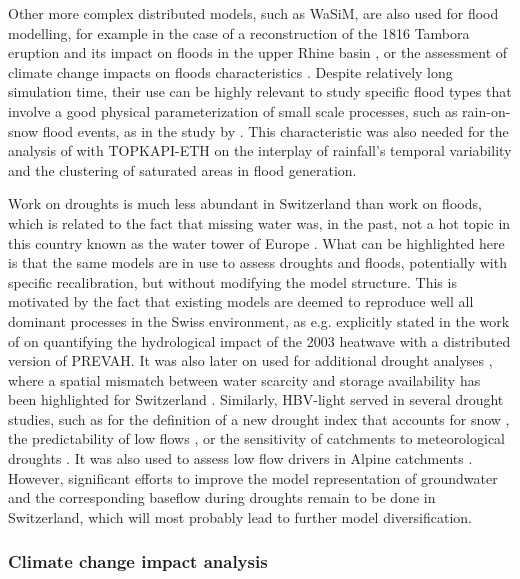 \documentclass[10pt,a4paper]{article}
\begin{document}
Other more complex distributed models, such as WaSiM, are also used for flood modelling, for example in the case of a reconstruction of the 1816 Tambora eruption and its impact on floods in the upper Rhine basin \citep[see Fig. \ref{fig:map};][]{Rossler2018}, or the assessment of climate change impacts on floods characteristics \citep{Keller2019a}. Despite relatively long simulation time, their use can be highly relevant to study specific flood types that involve a good physical parameterization of small scale processes, such as rain-on-snow flood events, as in the study by \citet{Rossler2014}. This characteristic was also needed for the analysis of \citet{Paschalis_2014} with TOPKAPI-ETH on the interplay of rainfall's temporal variability and the clustering of saturated areas in flood generation.

Work on droughts is much less abundant in Switzerland than work on floods, which is related to the fact that missing water was, in the past, not a hot topic in this country known as the water tower of Europe \citep{Milano2015}. What can be highlighted here is that the same models are in use to assess droughts and floods, potentially with specific recalibration, but without modifying the model structure. This is motivated by the fact that existing models are deemed to reproduce well all dominant processes in the Swiss environment, as e.g. explicitly stated in the work of \citet{Zappa2007a} on quantifying the hydrological impact of the 2003 heatwave with a distributed version of PREVAH. It was also later on used for additional drought analyses \citep{Brunner2019e, Zappa2019}, where a spatial mismatch between water scarcity and storage availability has been highlighted for Switzerland \citep{Brunner2019e}. Similarly, HBV-light served in several drought studies, such as for the definition of a new drought index that accounts for snow \citep{Staudinger2014}, the predictability of low flows \citep{Staudinger2014a}, or the sensitivity of catchments to meteorological droughts \citep{Staudinger2015}. It was also used to assess low flow drivers in Alpine catchments \citep{Arnoux_2020}. However, significant efforts to improve the model representation of groundwater and the corresponding baseflow during droughts remain to be done in Switzerland, which will most probably lead to further model diversification.


\subsubsection{Climate change impact analysis}
\label{sec:application:climatechange}
\end{document}

